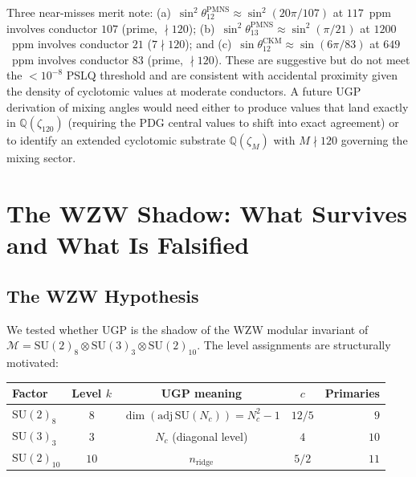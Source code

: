 \documentclass[11pt]{article}
\theoremstyle{remark}
\newcommand{\Nc}{N_c}
\begin{document}
Three near-misses merit note: (a)~$\sin^2\!\theta_{12}^{\mathrm{PMNS}}
\approx \sin^2(20\pi/107)$ at $117$~ppm involves conductor $107$ (prime,
$\nmid 120$); (b)~$\sin^2\!\theta_{13}^{\mathrm{PMNS}} \approx
\sin^2(\pi/21)$ at $1200$~ppm involves conductor $21$ ($7\nmid 120$); and
(c)~$\sin\theta_{12}^{\mathrm{CKM}} \approx \sin(6\pi/83)$ at $649$~ppm
involves conductor $83$ (prime, $\nmid 120$).  These are suggestive but
do not meet the $<10^{-8}$ PSLQ threshold and are consistent with
accidental proximity given the density of cyclotomic values at moderate
conductors.  A future UGP derivation of mixing angles would need either
to produce values that land exactly in $\mathbb{Q}(\zeta_{120})$ (requiring
the PDG central values to shift into exact agreement) or to identify an
extended cyclotomic substrate $\mathbb{Q}(\zeta_M)$ with $M \nmid 120$
governing the mixing sector.

\section{The WZW Shadow: What Survives and What Is Falsified}
\label{sec:wzw}

\subsection{The WZW Hypothesis}

We tested whether UGP is the shadow of the WZW modular invariant of
$\mathcal{M} = \mathrm{SU}(2)_8 \otimes \mathrm{SU}(3)_3 \otimes \mathrm{SU}(2)_{10}$.
The level assignments are structurally motivated:

\begin{table}[H]
\centering
\small
\begin{tabular}{lcccr}
\toprule
Factor & Level $k$ & UGP meaning & $c$ & Primaries \\
\midrule
$\mathrm{SU}(2)_8$  & $8$ & $\dim(\mathrm{adj}\,\mathrm{SU}(\Nc)) = \Nc^2-1$ & $12/5$ & $9$ \\
$\mathrm{SU}(3)_3$  & $3$ & $\Nc$ (diagonal level) & $4$ & $10$ \\
$\mathrm{SU}(2)_{10}$ & $10$ & $n_{\mathrm{ridge}}$ & $5/2$ & $11$ \\
\bottomrule
\end{tabular}
\end{table}
\end{document}
